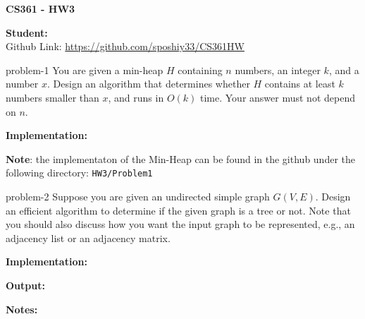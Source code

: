 \documentclass[letterpaper, 11pt]{extarticle}
\begin{document}
\begin{Large}
    \textsf{\textbf{CS361 - HW3}}
\end{Large}

\vspace{1ex}

\textsf{\textbf{Student:}} \\

Github Link: \href{https://github.com/sposhiy33/CS361HW}{https://github.com/sposhiy33/CS361HW}

\vspace{2ex}


\begin{problem}{}{problem-1}
    You are given a min-heap $H$ containing $n$ numbers, an integer $k$, and a number $x$. Design an algorithm that determines whether $H$ contains at least $k$ numbers smaller than $x$, and runs in $O(k)$ time. Your answer must not depend on $n$.
\end{problem}

\vspace{1ex}
\noindent\textbf{Implementation:}


\textbf{Note}: the implementaton of the Min-Heap can be found in the github under the following directory: \texttt{HW3/Problem1}


\begin{problem}{}{problem-2}
    Suppose you are given an undirected simple graph $G(V, E)$. Design an efficient algorithm to determine if the given graph is a tree or not. Note that you should also discuss how you want the input graph to be represented, e.g., an adjacency list or an adjacency matrix.
\end{problem}

\vspace{1ex}
\noindent\textbf{Implementation:}


\vspace{1ex}
\noindent\textbf{Output:}


\vspace{1ex}
\noindent\textbf{Notes:}
\end{document}
